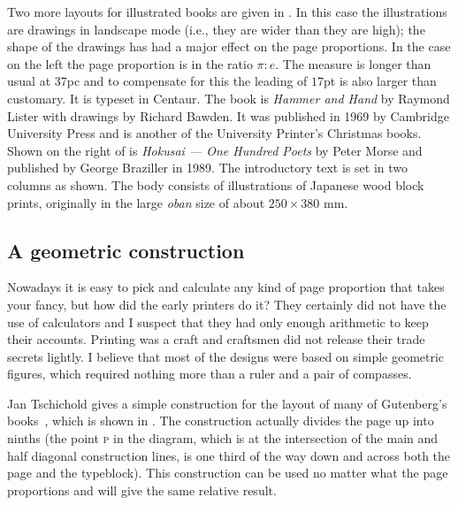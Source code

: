 \documentclass[10pt,letterpaper]{memoir}
\begin{document}
    Two more layouts for illustrated books are given in .
In this case the illustrations are drawings in landscape mode (i.e., they
are wider than they are high); the shape of the drawings has had a major
effect on the page proportions. In the case on the left the page
proportion is in the ratio $\pi : e$. The measure is longer than usual
at $37$pc and to compensate for this the leading of $17$pt 
is also larger than customary. It is typeset in Centaur.
The book is
\textit{Hammer and Hand} by Raymond Lister with drawings by Richard Bawden.
It was published in 1969 by Cambridge University Press and is another of
the University Printer's Christmas books.
Shown on the right of  is \textit{Hokusai --- One Hundred Poets}
by Peter Morse and published by George Braziller in 1989. The introductory
text is set in two columns as shown. The body consists of illustrations of
Japanese wood block prints, originally in the large \textit{oban} size
of about $250 \times 380$ mm.

\subsection{A geometric construction}

    Nowadays it is easy to pick and calculate any kind of page proportion
that takes your fancy, but how did the early printers do it? They certainly
did not have the use of calculators and I suspect that they had only enough
arithmetic to keep their accounts. Printing was a craft and craftsmen did
not release their trade secrets lightly. I believe that most of the designs
were based on simple geometric figures, which required nothing more than
a ruler and a pair of compasses.


 Jan Tschichold gives a simple construction for the layout of many of Gutenberg's 
books~\cite[pages 44--57]{TSCHICHOLD91}, which is shown in .
The construction actually divides the page up into ninths (the point
\textsc{p} in the diagram, which is at the intersection of the main and half
diagonal construction lines, is one third of the way down and across both the
page and the typeblock). This construction can be used no matter what the
page proportions and will give the same relative result.
\end{document}
